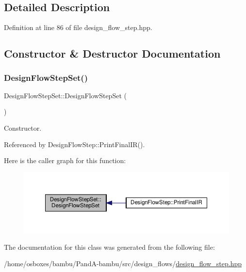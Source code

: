 \subsection{Detailed Description}


Definition at line 86 of file design\+\_\+flow\+\_\+step.\+hpp.



\subsection{Constructor \& Destructor Documentation}
\mbox{\label{classDesignFlowStepSet_a3b7680ef212ca85887d1f6cd08ef7867}} 
\subsubsection{\texorpdfstring{Design\+Flow\+Step\+Set()}{DesignFlowStepSet()}}
{\footnotesize\ttfamily Design\+Flow\+Step\+Set\+::\+Design\+Flow\+Step\+Set (\begin{DoxyParamCaption}{ }\end{DoxyParamCaption})}



Constructor. 



Referenced by Design\+Flow\+Step\+::\+Print\+Final\+I\+R().

Here is the caller graph for this function\+:
\nopagebreak
\begin{figure}[H]
\begin{center}
\leavevmode
\includegraphics[width=350pt]{d3/d87/classDesignFlowStepSet_a3b7680ef212ca85887d1f6cd08ef7867_icgraph}
\end{center}
\end{figure}


The documentation for this class was generated from the following file\+:\begin{DoxyCompactItemize}
\item 
/home/osboxes/bambu/\+Pand\+A-\/bambu/src/design\+\_\+flows/\hyperlink{design__flow__step_8hpp}{design\+\_\+flow\+\_\+step.\+hpp}\end{DoxyCompactItemize}

